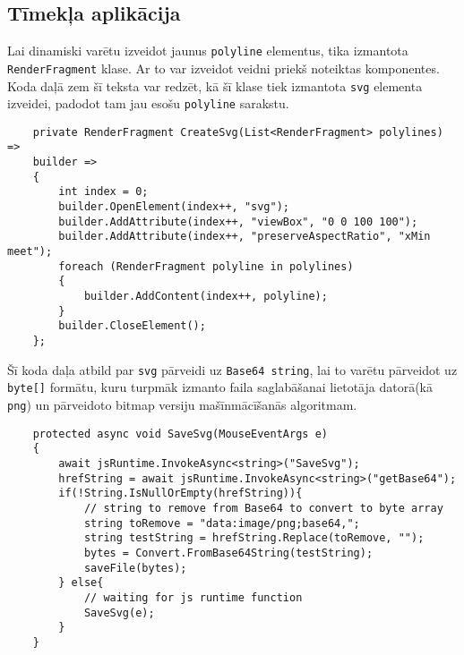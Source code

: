 \subsection{Tīmekļa aplikācija}

\par Lai dinamiski varētu izveidot jaunus \texttt{polyline} elementus, tika izmantota \texttt{RenderFragment} \cite{render_fragment}  klase. Ar to var izveidot veidni priekš noteiktas komponentes. Koda daļā zem šī teksta var redzēt, kā šī klase tiek izmantota \texttt{svg} elementa izveidei, padodot tam jau esošu \texttt{polyline} sarakstu.

{
\begin{verbatim}
    private RenderFragment CreateSvg(List<RenderFragment> polylines) =>
    builder =>
    {
        int index = 0;
        builder.OpenElement(index++, "svg");
        builder.AddAttribute(index++, "viewBox", "0 0 100 100");
        builder.AddAttribute(index++, "preserveAspectRatio", "xMin meet");
        foreach (RenderFragment polyline in polylines)
        {
            builder.AddContent(index++, polyline);
        }
        builder.CloseElement();
    };
\end{verbatim}
}

\par Šī koda daļa atbild par \texttt{svg} pārveidi uz \texttt{Base64 string}, lai to varētu pārveidot uz \texttt{byte[]} \cite{from_base_64_to_string} formātu, kuru turpmāk izmanto faila saglabāšanai lietotāja datorā(kā \texttt{png}) un pārveidoto bitmap versiju mašīnmācīšanās algoritmam.
{
\begin{verbatim}
    protected async void SaveSvg(MouseEventArgs e)
    {
        await jsRuntime.InvokeAsync<string>("SaveSvg");
        hrefString = await jsRuntime.InvokeAsync<string>("getBase64");
        if(!String.IsNullOrEmpty(hrefString)){
            // string to remove from Base64 to convert to byte array
            string toRemove = "data:image/png;base64,";
            string testString = hrefString.Replace(toRemove, "");
            bytes = Convert.FromBase64String(testString);
            saveFile(bytes);
        } else{
            // waiting for js runtime function
            SaveSvg(e);
        }
    }
\end{verbatim}
}


